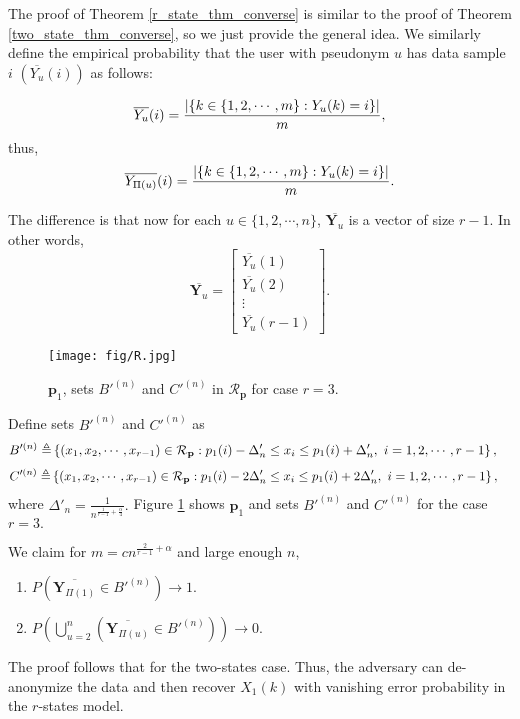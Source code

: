 The proof of Theorem \ref{r_state_thm_converse} is similar to the proof of Theorem \ref{two_state_thm_converse}, so we just provide the general idea. We similarly define the empirical probability that the user with pseudonym $u$ has data sample $i$ $\left(\overline{{Y}_{u}}(i)\right)$ as follows:

\[
\overline{Y_u}(i)=\frac{\lvert\left\{k \in \{1, 2, \cdots, m\}:Y_u(k)=i\right\}\rvert}{m},
\]
thus,
\[
\overline{Y_{\Pi(u)}}(i)=\frac{\lvert\left\{k \in \{1, 2, \cdots, m\}:Y_u(k)=i\right\}\rvert}{m}.
\]

The difference is that now for each $u \in \{1,2,\cdots, n \}$, $\overline{\textbf{Y}_{u}}$ is a vector of size $r-1$. In other words,
\[\overline{\textbf{Y}_{u}}=\begin{bmatrix}
\overline{Y_u}(1) \\ \overline{Y_u}(2) \\ \vdots \\\overline{Y_u}(r-1) \end{bmatrix}.\]


\begin{figure}
  \centering
  \texttt{[image: fig/R.jpg]}
  \centering
  \caption{$\textbf{p}_1$, sets $B'^{(n)}$ and $C'^{(n)}$ in $\mathcal{R}_\textbf{p}$ for case $r=3$.}
  \label{fig:rpp}
\end{figure}

Define sets $B'^{(n)}$ and $C'^{(n)}$ as
\begin{align}
 \nonumber B'^{(n)}\triangleq & \left\{(x_1,x_2, \cdots ,x_{r-1}) \in \mathcal{R}_{\textbf{p}}: p_1(i)-\Delta'_n \leq x_i \leq p_1(i)+\Delta'_n,\ i=1,2, \cdots, r-1\right\},
\end{align}
\begin{align}
\nonumber C'^{(n)}\triangleq &\left\{(x_1,x_2, \cdots ,x_{r-1}) \in \mathcal{R}_{\textbf{p}}: p_1(i)-2 \Delta'_n \leq x_i \leq p_1(i)+2 \Delta'_n,\ i=1,2, \cdots ,r-1\right\},
\end{align}
where $\Delta'_n = \frac{1}{n^{\frac{1}{r-1}+\frac{\alpha}{4}}}.$ Figure \ref{fig:rpp} shows $\textbf{p}_1$ and sets  $B'^{(n)}$ and $C'^{(n)}$ for the case $r=3.$

We claim for $m =cn^{\frac{2}{r-1} +  \alpha}$ and large enough $n$,
\begin{enumerate}
\item $P\left( \overline{\textbf{Y}_{\Pi(1) }}\in B'^{(n)}\right) \rightarrow 1$.
\item $P\left( \bigcup\limits_{u=2}^{n} \left(\overline{\textbf{Y}_{\Pi(u)}}\in B'^{(n)}\right)\right) \rightarrow 0.$
\end{enumerate}
The proof follows that for the two-states case. Thus, the adversary can de-anonymize the data and then recover $X_1(k)$ with vanishing error probability in the $r$-states model.



